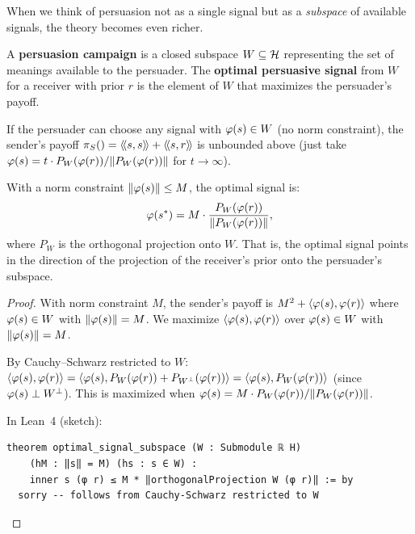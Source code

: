 When we think of persuasion not as a single signal but as a \emph{subspace} of
available signals, the theory becomes even richer.

\begin{definition}
\label{def:subspace-persuasion}
A \textbf{persuasion campaign} is a closed subspace $W \subseteq \mathcal{H}$
representing the set of meanings available to the persuader. The
\textbf{optimal persuasive signal} from $W$ for a receiver with prior $r$ is
the element of $W$ that maximizes the persuader's payoff.
\end{definition}

\begin{theorem}
\label{thm:optimal-subspace}
If the persuader can choose any signal with $\varphi(s) \in W$ (no norm
constraint), the sender's payoff $\pi_{S}() = \langle\!\langle s, s \rangle\!\rangle + \langle\!\langle s, r \rangle\!\rangle$ is
unbounded above (just take $\varphi(s) = t \cdot P_W(\varphi(r)) / \lVert P_W(\varphi(r)) \rVert$ for $t \to \infty$).

With a norm constraint $\lVert \varphi(s) \rVert \leq M$, the optimal signal is:
\[
  \varphi(s^*) = M \cdot \frac{P_W(\varphi(r))}{\lVert P_W(\varphi(r)) \rVert},
\]
where $P_W$ is the orthogonal projection onto $W$. That is, the optimal signal
points in the direction of the projection of the receiver's prior onto the
persuader's subspace.
\end{theorem}

\begin{proof}
With norm constraint $M$, the sender's payoff is $M^2 + \langle \varphi(s), \varphi(r) \rangle$
where $\varphi(s) \in W$ with $\lVert \varphi(s) \rVert = M$. We maximize
$\langle \varphi(s), \varphi(r) \rangle$ over $\varphi(s) \in W$ with $\lVert \varphi(s) \rVert = M$.

By Cauchy--Schwarz restricted to $W$: $\langle \varphi(s), \varphi(r) \rangle =
\langle \varphi(s), P_W(\varphi(r)) + P_{W^\perp}(\varphi(r)) \rangle =
\langle \varphi(s), P_W(\varphi(r)) \rangle$ (since $\varphi(s) \perp W^\perp$). This is
maximized when $\varphi(s) = M \cdot P_W(\varphi(r)) / \lVert P_W(\varphi(r)) \rVert$.

In Lean~4 (sketch):
\begin{lstlisting}
theorem optimal_signal_subspace (W : Submodule ℝ H)
    (hM : ‖s‖ = M) (hs : s ∈ W) :
    inner s (φ r) ≤ M * ‖orthogonalProjection W (φ r)‖ := by
  sorry -- follows from Cauchy-Schwarz restricted to W
\end{lstlisting}
\end{proof}


